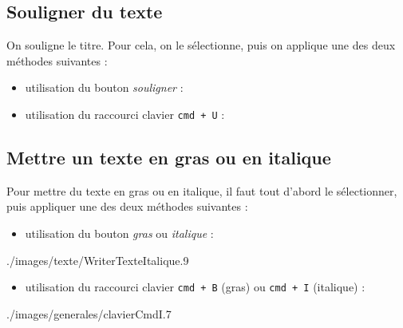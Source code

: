 \subsection{Souligner du texte}

On souligne le titre. Pour cela, on le sélectionne, puis on applique une des deux méthodes suivantes :

\begin{itemize}
\item utilisation du bouton \emph{souligner} :  
\item utilisation du raccourci clavier \texttt{cmd + U} : 
\end{itemize}




\subsection{Mettre un texte en gras ou en italique}

Pour mettre du texte en gras ou en italique, il faut tout d'abord le sélectionner, puis appliquer une des deux méthodes suivantes :

\begin{itemize}
\item utilisation du bouton \emph{gras} ou \emph{italique} :
\end{itemize}
%
              {./images/texte/WriterTexteItalique}{.9\textwidth}
\begin{itemize}
\item utilisation du raccourci clavier \texttt{cmd + B} (gras) ou \texttt{cmd + I} (italique) :
\end{itemize}
%
              {./images/generales/clavierCmdI}{.7\textwidth}


    









